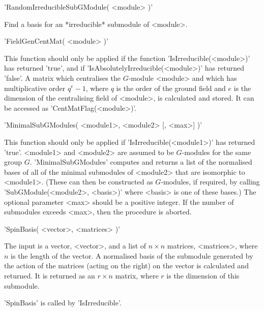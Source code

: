 'RandomIrreducibleSubGModule( <module> )'

Find a basis for an *irreducible* submodule of <module>.


'FieldGenCentMat( <module> )'

This      function should  only       be    applied  if  the     function
'IsIrreducible(<module>)'   has       returned      'true',    and     if
'IsAbsolutelyIrreducible(<module>)' has returned 'false'.  A matrix which
centralises  the $G$-module <module>  and  which has multiplicative order
$q^e-1$, where  $q$  is the order   of the ground  field and  $e$  is the
dimension   of the centralising  field  of  <module>,  is calculated  and
stored. It can be accessed as 'CentMatFlag(<module>)'.


'MinimalSubGModules( <module1>, <module2> [, <max>] )'

This function should  only  be applied  if 'IsIrreducible(<module1>)' has 
returned
'true'.  <module1> and  <module2> are assumed  to be $G$-modules for  the
same group $G$.  'MinimalSubGModules' computes and  returns a list of the
normalised bases of all  of the minimal submodules  of <module2> that are
isomorphic to <module1>.  (These can then  be constructed as $G$-modules,
if required, by calling 'SubGModule(<module2>, <basis>)' where <basis> is
one  of these bases.)  The optional  parameter <max> should be a positive
integer. If the number of submodules exceeds <max>, then the procedure is
aborted.


'SpinBasis( <vector>, <matrices> )'

The input  is a vector, <vector>, and  a list of   $n \times n$ matrices,
<matrices>, where $n$ is the length of the vector.  A normalised basis of
the   submodule generated by  the action  of  the matrices (acting on the
right) on the vector is calculated and returned.  It is returned as an $r
\times n$ matrix, where $r$ is the dimension of this submodule.

'SpinBasis' is called by 'IsIrreducible'.


